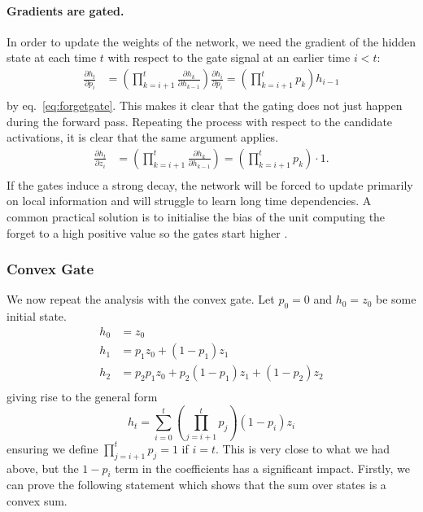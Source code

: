 \paragraph{Gradients are gated.}
In order to update the weights of the network, we need the gradient of the hidden
state at each time \(t\) with respect to the gate signal at an earlier time \(i < t\):
\begin{align}
	\frac{\partial h_t}{\partial p_i} &= 
		\left(\prod_{k=i+1}^t \frac{\partial h_k}{\partial h_{k-1}}\right) 
			\frac{\partial h_i}{\partial p_i} = 
		\left(\prod_{k=i+1}^t p_k\right)
			h_{i-1} \\
\end{align} by eq.~\ref{eq:forgetgate}.
This makes it clear that the gating does not just happen during the forward pass. 
Repeating the process with respect to the candidate activations, it is clear that
the same argument applies.
\begin{align}
	\frac{\partial h_t}{\partial z_i} &= 
	\left(\prod_{k=i+1}^t \frac{\partial h_k}{\partial h_{k-1}}\right) 
	= \left(\prod_{k=i+1}^t p_k\right) \cdot
			1. \\
\end{align} If the gates
induce a strong decay, the network will be forced to update primarily on
local information and will struggle to learn long time dependencies.
A common practical solution is to initialise the bias of the unit computing the forget to a high
positive value so the gates start higher \autocite{Jozefowicz2015}.

\subsubsection{Convex Gate}
We now repeat the analysis with the convex gate. Let \(p_0 = 0\) and \(h_0 = z_0\) be some initial
state.
\begin{align}
	h_0 &= z_0 \\
    h_1 &= p_1z_0 + (1-p_1)z_1 \\
    h_2 &= p_2p_1z_0 + p_2(1-p_1)z_1 + (1-p_2)z_2 \\
\end{align} giving rise to the general form
\begin{equation}
	h_t = \sum_{i=0}^t \left(\prod_{j=i+1}^t p_j\right) (1 - p_i) z_i
\end{equation} ensuring we define \(\prod_{j=i+1}^tp_j = 1\) if \(i = t\).
This is very close to what we had above, but the \(1-p_i\) term in the
coefficients has a significant impact. Firstly, we can prove the following statement which shows
that the sum over states is a convex sum.

